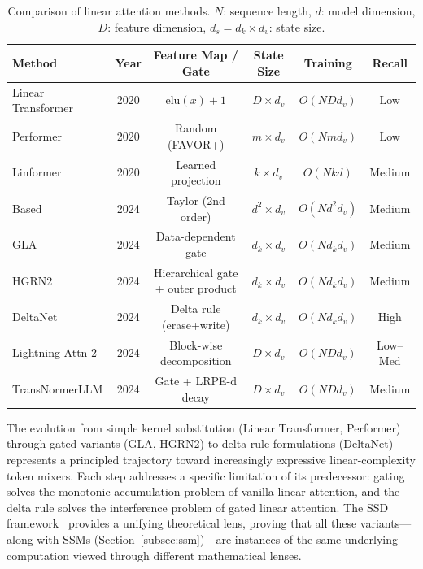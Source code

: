 \begin{table}[t]
\centering
\caption{Comparison of linear attention methods. $N$: sequence length, $d$: model dimension, $D$: feature dimension, $d_s = d_k \times d_v$: state size.}
\label{tab:linear-attn-comparison}
\small
\begin{tabular}{lccccc}
\toprule
\textbf{Method} & \textbf{Year} & \textbf{Feature Map / Gate} & \textbf{State Size} & \textbf{Training} & \textbf{Recall} \\
\midrule
Linear Transformer & 2020 & $\text{elu}(x)+1$ & $D \times d_v$ & $O(NDd_v)$ & Low \\
Performer          & 2020 & Random (FAVOR+) & $m \times d_v$ & $O(Nmd_v)$ & Low \\
Linformer          & 2020 & Learned projection & $k \times d_v$ & $O(Nkd)$ & Medium \\
Based              & 2024 & Taylor (2nd order) & $d^2 \times d_v$ & $O(Nd^2 d_v)$ & Medium \\
GLA                & 2024 & Data-dependent gate & $d_k \times d_v$ & $O(Nd_k d_v)$ & Medium \\
HGRN2              & 2024 & Hierarchical gate + outer product & $d_k \times d_v$ & $O(Nd_k d_v)$ & Medium \\
DeltaNet           & 2024 & Delta rule (erase+write) & $d_k \times d_v$ & $O(Nd_k d_v)$ & High \\
Lightning Attn-2   & 2024 & Block-wise decomposition & $D \times d_v$ & $O(ND d_v)$ & Low--Med \\
TransNormerLLM     & 2024 & Gate + LRPE-d decay & $D \times d_v$ & $O(NDd_v)$ & Medium \\
\bottomrule
\end{tabular}
\end{table}

The evolution from simple kernel substitution (Linear Transformer, Performer) through gated variants (GLA, HGRN2) to delta-rule formulations (DeltaNet) represents a principled trajectory toward increasingly expressive linear-complexity token mixers. Each step addresses a specific limitation of its predecessor: gating solves the monotonic accumulation problem of vanilla linear attention, and the delta rule solves the interference problem of gated linear attention. The SSD framework~\cite{dao2024transformers} provides a unifying theoretical lens, proving that all these variants---along with SSMs (Section~\ref{subsec:ssm})---are instances of the same underlying computation viewed through different mathematical lenses.


